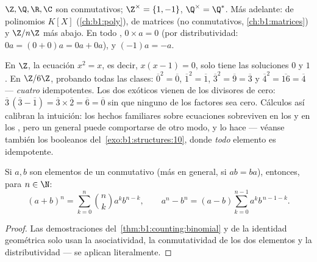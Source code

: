 \begin{example}\label{ex:b1:structures:rings}
$\Z, \Q, \R, \C$ son  conmutativos; $\Z^\times = \{1, -1\}$,
$\Q^\times = \Q^*$. Más adelante:  de polinomios $K[X]$
(\cref{ch:b1:poly}),  de matrices (no conmutativos,
\cref{ch:b1:matrices}) y $\Z/n\Z$ más abajo. En todo ,
$0 \times a = 0$ (por distributividad: $0a = (0+0)a = 0a + 0a$), y
$(-1)a = -a$.
\end{example}

\begin{example}\label{ex:b1:structures:idempotents}
En $\Z$, la ecuación $x^2 = x$, es decir, $x(x - 1) = 0$, solo tiene las
soluciones $0$ y $1$. En $\Z/6\Z$, probando todas las clases:
$\overline0^2 = \overline0$, $\overline1^2 = \overline1$,
$\overline3^2 = \overline9 = \overline3$ y $\overline4^2 =
\overline{16} = \overline4$ --- \emph{cuatro} idempotentes. Los dos
exóticos vienen de los divisores de cero: $\overline3\,(\overline3 -
\overline1) = \overline3 \times \overline2 = \overline6 =
\overline0$ sin que ninguno de los factores sea cero. Cálculos así
calibran la intuición: los hechos familiares sobre ecuaciones
sobreviven en los  y en los , pero un
 general puede comportarse de otro modo, y lo hace --- véanse
también los  booleanos del~\cref{exo:b1:structures:10}, donde
\emph{todo} elemento es idempotente.
\end{example}

\begin{proposition}\label{prop:b1:structures:binomial}
Si $a, b$ son elementos de un  conmutativo (más en general, si
$ab = ba$), entonces, para $n \in \N$:
\[
(a+b)^n = \sum_{k=0}^n \binom nk a^k b^{n-k},
\qquad
a^n - b^n = (a - b) \sum_{k=0}^{n-1} a^k b^{\,n-1-k} .
\]
\end{proposition}

\begin{proof}
Las demostraciones del~\cref{thm:b1:counting:binomial} y de la identidad
geométrica solo usan la asociatividad, la conmutatividad de los dos
elementos y la distributividad --- se aplican literalmente.
\end{proof}

